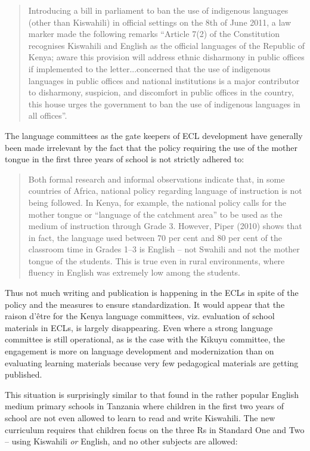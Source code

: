 \documentclass[output=paper,colorlinks,citecolor=brown]{langscibook}
\begin{document}
\begin{quotation}
Introducing a bill in parliament  to ban the use of indigenous languages (other than Kiswahili) in official settings on the 8th of June 2011, a law marker made the following remarks  “Article 7(2) of the Constitution recognises Kiswahili and English as the official languages of the Republic of Kenya; aware this provision will address ethnic disharmony in public offices if implemented to the letter...concerned that the use of indigenous languages in public offices and national institutions is a major contributor to disharmony, suspicion, and discomfort in public offices in the country, this house urges the government to ban the use of indigenous languages in all offices”. \hfill \citep[21]{Kenya-National-Assembly-Official-Records2011}  
\end{quotation}

The language committees as the gate keepers of ECL development have generally been made irrelevant by the fact that the policy requiring the use of the mother tongue in the first three years of school is not strictly adhered to: 

\begin{quote}\sloppy
Both formal research and informal observations indicate that, in some countries of Africa, national policy regarding language of instruction is not being followed. In Kenya, for example, the national policy calls for the mother tongue or “language of the catchment area” to be used as the medium of instruction through Grade 3. However, Piper (2010) shows that in fact, the language used between 70 per cent and 80 per cent of the classroom time in Grades 1–3 is English – not Swahili and not the mother tongue of the students. This is true even in rural environments, where fluency in English was extremely low among the students.  \hfill \citep[156]{Trudell2013}
\end{quote}

Thus not much writing and publication is happening in the ECLs in spite of the policy and the measures to ensure standardization.  It would appear that the raison d’être for the Kenya language committees, viz. evaluation of school materials in ECLs, is largely disappearing. Even where a strong language committee is still operational, as is the case with the Kikuyu committee, the engagement is more on language development and modernization than on evaluating learning materials because very few pedagogical materials are getting published. 

This situation is surprisingly similar to that found in the rather popular English medium primary schools in Tanzania where children in the first two years of school are not even allowed to learn to read and write Kiswahili. The new curriculum requires that children focus on the three Rs in Standard One and Two – using Kiswahili \emph{or} English, and no other subjects are allowed:
\end{document}
